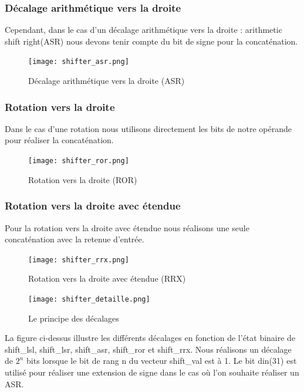 \documentclass[10pt,a4paper]{article}
\begin{document}
			\subsubsection{Décalage arithmétique vers la droite}							%
				Cependant, dans le cas d'un décalage arithmétique vers la droite : 
				arithmetic shift right(ASR) nous devons tenir compte du bit de signe pour la concaténation.

				\begin{figure}[H]															%
					\centering 																%
					\texttt{[image: shifter\_asr.png]} 				%
					\caption{Décalage arithmétique vers la droite (ASR)}%
					\label{Fig.main2} 														%
				\end{figure}

			\subsubsection{Rotation vers la droite}											%
				Dans le cas d’une rotation nous utilisons directement les bits de notre opérande pour réaliser 
				la concaténation.   
				
				\begin{figure}[H]															%
					\centering 																%
					\texttt{[image: shifter\_ror.png]} 				%
					\caption{Rotation vers la droite (ROR)}%
					\label{Fig.main2} 														%
				\end{figure}
			\subsubsection{Rotation vers la droite avec étendue}							%
				Pour la rotation vers la droite avec étendue nous réalisons une seule concaténation avec la 
				retenue d’entrée.

				\begin{figure}[H]															%
					\centering 																%
					\texttt{[image: shifter\_rrx.png]} 				%
					\caption{Rotation vers la droite avec étendue (RRX)}%
					\label{Fig.main2} 														%
				\end{figure}
			
			\begin{figure}[H]															%
				\centering 																%
				\texttt{[image: shifter\_detaille.png]} 			%
				\caption{Le principe des décalages}										%
				\label{Fig.main2} 														%
			\end{figure}
			La figure ci-dessus illustre les différents décalages en fonction de l'état binaire de shift\_lsl, 
			shift\_lsr, shift\_asr, shift\_ror et shift\_rrx. Nous réalisons un décalage de $2^n$ bits lorsque 
			le bit de rang n du vecteur shift\_val est à 1. Le bit din(31) est utilisé pour réaliser une 
			extension de signe dans le cas où l'on souhaite réaliser un ASR.
\end{document}
